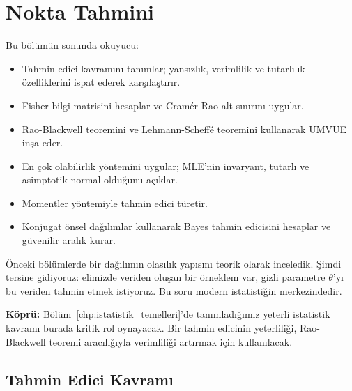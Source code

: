 \chapter{Nokta Tahmini}
\label{chp:nokta_tahmin}


\begin{kazanimlar}
Bu bölümün sonunda okuyucu:
\begin{itemize}
  \item Tahmin edici kavramını tanımlar; yansızlık, verimlilik ve tutarlılık özelliklerini ispat ederek karşılaştırır.
  \item Fisher bilgi matrisini hesaplar ve Cramér-Rao alt sınırını uygular.
  \item Rao-Blackwell teoremini ve Lehmann-Scheffé teoremini kullanarak UMVUE inşa eder.
  \item En çok olabilirlik yöntemini uygular; MLE'nin invaryant, tutarlı ve asimptotik normal olduğunu açıklar.
  \item Momentler yöntemiyle tahmin edici türetir.
  \item Konjugat önsel dağılımlar kullanarak Bayes tahmin edicisini hesaplar ve güvenilir aralık kurar.
\end{itemize}
\end{kazanimlar}

\begin{motivasyon}
Önceki bölümlerde bir dağılımın olasılık yapısını teorik olarak inceledik. Şimdi tersine gidiyoruz: elimizde veriden oluşan bir örneklem var, gizli parametre $\theta$'yı bu veriden tahmin etmek istiyoruz. Bu soru modern istatistiğin merkezindedir.

\medskip
\noindent\textbf{Köprü:} Bölüm~\ref{chp:istatistik_temelleri}'de tanımladığımız yeterli istatistik kavramı burada kritik rol oynayacak. Bir tahmin edicinin yeterliliği, Rao-Blackwell teoremi aracılığıyla verimliliği artırmak için kullanılacak.
\end{motivasyon}

\section{Tahmin Edici Kavramı}
\label{sec:tahmin_edici}

